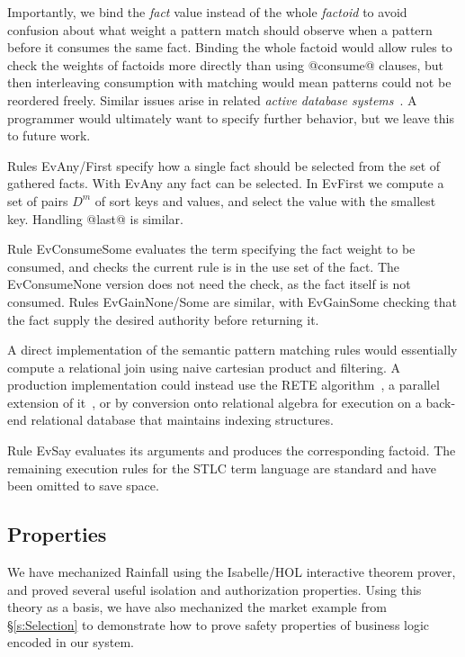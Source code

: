 Importantly, we bind the \emph{fact} value instead of the whole \emph{factoid} to avoid confusion about what weight a pattern match should observe when a pattern before it consumes the same fact. Binding the whole factoid would allow rules to check the weights of factoids more directly than using @consume@ clauses, but then interleaving consumption with matching would mean patterns could not be reordered freely. Similar issues arise in related \emph{active database systems}~\cite{Paton1999:Active}. A programmer would ultimately want to specify further behavior, but we leave this to future work.

Rules EvAny/First specify how a single fact should be selected from the set of gathered facts. With EvAny any fact can be selected. In EvFirst we compute a set of pairs $D^m$ of sort keys and values, and select the value with the smallest key. Handling @last@ is similar.

Rule EvConsumeSome evaluates the term specifying the fact weight to be consumed, and checks the current rule is in the use set of the fact. The EvConsumeNone version does not need the check, as the fact itself is not consumed. Rules EvGainNone/Some are similar, with EvGainSome checking that the fact supply the desired authority before returning it.

A direct implementation of the semantic pattern matching rules would essentially compute a relational join using naive cartesian product and filtering. A production implementation could instead use the RETE algorithm~\cite{Forgy1981:RETE, Doorenbos1995:ProductionMatching}, a parallel extension of it~\cite{Aref1998:LanaMatch}, or by conversion onto relational algebra for execution on a back-end relational database that maintains indexing structures.

Rule EvSay evaluates its arguments and produces the corresponding factoid. The remaining execution rules for the STLC term language are standard and have been omitted to save space.




\eject{}
\subsection{Properties}
\label{s:Properties}
We have mechanized Rainfall using the Isabelle/HOL interactive theorem prover, and proved several useful isolation and authorization properties. Using this theory as a basis, we have also mechanized the market example from \S\ref{s:Selection} to demonstrate how to prove safety properties of business logic encoded in our system.


